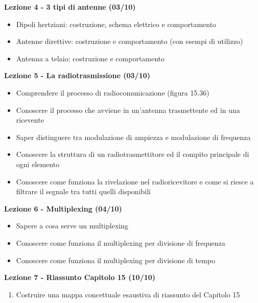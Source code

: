 \documentclass{article}
\begin{document}
	\begin{center}
		\textbf{Lezione 4 - 3 tipi di antenne (03/10)}
		\begin{itemize}
			\item Dipoli hertziani: costruzione, schema elettrico e comportamento
			\item Antenne direttive: costruzione e comportamento (con esempi di utilizzo)
			\item Antenna a telaio: costruzione e comportamento
		\end{itemize}
	\end{center}

	\begin{center}
		\textbf{Lezione 5 - La radiotrasmissione (03/10)}
		\begin{itemize}
			\item Comprendere il processo di radiocomunicazione (figura 15.36)
			\item Conoscere il processo che avviene in un'antenna trasmettente ed in una ricevente
			\item Saper distinguere tra modulazione di ampiezza e modulazione di frequenza
			\item Conoscere la struttura di un radiotrasmettitore ed il compito principale di ogni elemento
			\item Conoscere come funziona la rivelazione nel radioricevitore e come si riesce a filtrare il segnale tra tutti quelli disponibili
		\end{itemize}
	\end{center}

	\begin{center}
		\textbf{Lezione 6 - Multiplexing (04/10)}
		\begin{itemize}
			\item Sapere a cosa serve un multiplexing
			\item Conoscere come funziona il multiplexing per divisione di frequenza
			\item Conoscere come funziona il multiplexing per divisione di tempo
		\end{itemize}
	\end{center}
	
	\begin{center}
	\textbf{Lezione 7 - Riassunto Capitolo 15 (10/10)}
	\begin{enumerate}
	\item Costruire una mappa concettuale esaustiva di riassunto del Capitolo 15
	\end{enumerate}
	\end{center}
	
\end{document}
